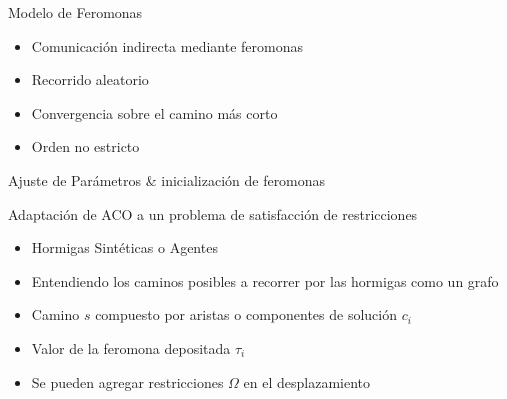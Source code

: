 \begin{frame}{Modelo de Feromonas}
\begin{itemize}
    \item Comunicaci\'on indirecta mediante feromonas
    \item Recorrido aleatorio
    \item Convergencia sobre el camino m\'as corto
    \item Orden no estricto
\end{itemize}
    \begin{algorithm}[H]
    \SetAlgoLined
     Ajuste de Par\'ametros \& inicializaci\'on de feromonas\;
     \caption{Algoritmo metaheur\'istica ACO}\label{ACO-Algo}
    \end{algorithm}
\end{frame}

\begin{frame}{Adaptaci\'on de ACO a un problema de satisfacci\'on de restricciones}
    \begin{itemize}
        \item Hormigas Sint\'eticas o Agentes
        \item Entendiendo los caminos posibles a recorrer por las hormigas como un grafo
        \item Camino $s$ compuesto por aristas o componentes de soluci\'on $c_i$
        \item Valor de la feromona depositada $\tau_{i}$
        \item Se pueden agregar restricciones $\Omega$ en el desplazamiento
    \end{itemize}
\end{frame}

